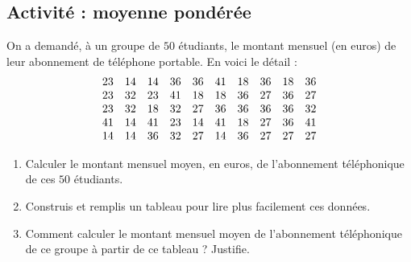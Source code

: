
\subsection*{Activité : moyenne pondérée}

On a demandé, à un groupe de $50$ étudiants, le montant mensuel (en euros) de leur abonnement de téléphone portable. En voici le détail :
\begin{equation*}
    \begin{array}[]{cccccccccc}
        23&14&14&36&36&41&18&36&18&36\\
        23&32&23&41&18&18&36&27&36&27\\
        23&32&18&32&27&36&36&36&36&32\\
        41&14&41&23&14&41&18&27&36&41\\
        14&14&36&32&27&14&36&27&27&27
    \end{array}
\end{equation*}
\begin{enumerate}
    \item
 Calculer le montant mensuel moyen, en euros, de l'abonnement téléphonique de ces $50$ étudiants.
 \item
 Construis et remplis un tableau pour lire plus facilement ces données.
 \item
     Comment calculer le montant mensuel moyen de l'abonnement téléphonique de ce groupe à partir de ce tableau ? Justifie.
\end{enumerate}
